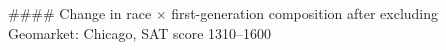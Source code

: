 #### Change in race × first-generation composition after excluding Geomarket: Chicago, SAT score 1310–1600
